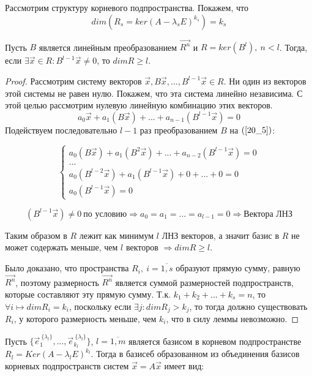 \documentclass[a4paper, 12pt]{article}
\begin{document}
Рассмотрим структуру корневого подпространства. Покажем, что 
\[dim(R_s = ker(A - \lambda_s E)^{k_s}) = k_s\]

\begin{lemma}\label{lemma-20_1}
Пусть $B$ является линейным преобразованием $\vec{R^n}$ и $R = ker(B^l),~ n < l$. Тогда, если $\exists \vec{x} \in R: B^{l-1} \vec{x} \neq 0$, то $dim R \geq l$.
\begin{proof}
Рассмотрим систему векторов $\vec{x}, B\vec{x}, ..., B^{l-1} \vec{x} \in R$. Ни один из векторов этой системы не равен нулю. Покажем, что эта система линейно независима. С этой целью рассмотрим нулевую линейную комбинацию этих векторов.
\begin{equation}
a_0 \vec{x} + a_1(B \vec{x}) + ... + a_{n-1}(B^{l-1} \vec{x}) = 0
\label{20_5}
\end{equation}
Подействуем последовательно $l - 1$ раз преобразованием $B$ на $(\ref{20_5})$:

\begin{equation*}
\begin{cases}
   a_0(B \vec{x}) + a_1 (B^2 \vec{x}) + ... + a_{n-2}(B^{l-1} \vec{x}) = 0 \\
   ... \\
   a_0(B^{l-2} \vec{x}) + a_1(B^{l-1} \vec{x}) + 0 + ... + 0 = 0 \\
   a_0 (B^{l-1} \vec{x}) = 0
\end{cases}
\end{equation*}

\[(B^{l-1} \vec{x}) \neq 0 ~\text{по условию} \Rightarrow a_0 = a_1 = ... = a_{l-1} = 0 \Rightarrow \text{Вектора ЛНЗ}\]

Таким образом в $R$ лежит как минимум $l$ ЛНЗ векторов, а значит базис в $R$ не может содержать меньше, чем $l$ векторов $\Rightarrow dim R \geq l$.

Было доказано, что пространства $R_i,~ i = \overline{1,s}$ образуют прямую сумму, равную $\vec{R^n}$, поэтому размерность $\vec{R^n}$ является суммой размерностей подпространств, которые составляют эту прямую сумму. Т.к. $k_1 + k_2 + ... + k_s = n$, то $\forall i \longmapsto dim R_i = k_i$, поскольку если $\exists j: dim R_j > k_j$, то тогда должно существовать $R_i$, у которого размерность меньше, чем $k_i$, что в силу леммы невозможно.
\end{proof}
\end{lemma}

Пусть $\{\vec{e}_1^{\: \{\lambda_l\}}, ... , \vec{e}_{k_l}^{\: \{\lambda_l\}}\}$, $l = \overline{1,m}$ является базисом в корневом подпространстве $R_l = Ker (A - \lambda_l E)^{k_l}$. Тогда в базисеб образованном из объединения базисов корневых подпространств систем $\vec{x} = A \vec{x}$ имеет вид:
\end{document}

